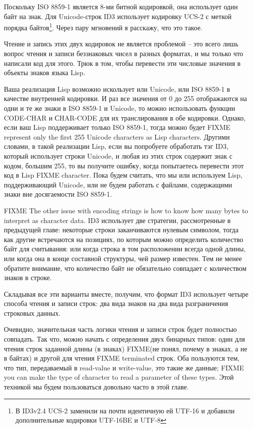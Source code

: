 Поскольку ISO 8859-1 является 8-ми битной кодировкой, она использует один байт на
знак. Для Unicode-строк ID3 использует кодировку UCS-2 с меткой порядка байтов\footnote{В
  ID3v2.4 UCS-2 заменили на почти идентичную ей UTF-16 и добавили дополнительные кодировки
  UTF-16BE и UTF-8}. Через пару мгновений я расскажу, что это такое.

Чтение и запись этих двух кодировок не является проблемой -- это всего лишь вопрос чтения
и записи беззнаковых чисел в разных форматах, и мы только что написали код для этого.
Трюк в том, чтобы перевести эти числовые значения в объекты знаков языка Lisp.

Ваша реализация Lisp возможно искользует или Unicode, или ISO 8859-1 в качестве внутренней
кодировки.  И раз все значения от 0 до 255 отображаются на одни и те же знаки в ISO 8859-1
и Unicode, то можно использовать функции CODE-CHAR и СHAR-CODE для их транслирования в обе
кодировки.  Однако, если ваш Lisp поддерживает только ISO 8859-1, тогда можно будет FIXME
represent only the first 255 Unicode characters as Lisp characters.  Другими словами, в
такой реализации Lisp, если вы попробуете обработать тэг ID3, который использует строки
Unicode, и любая из этих строк содержит знак с кодом, большим 255, то вы получите ошибку,
когда попытаетесь перевести этот код в Lisp FIXME character.  Пока будем считать, что мы
или используем Lisp, поддерживающий Unicode, или не будем работать с файлами, содержащими
знаки вне досягаемости ISO 8859-1.

FIXME The other issue with encoding strings is how to know how many bytes to interpret as
character data.  ID3 использует две стратегии, рассмотренные в предыдущей главе: некоторые
строки заканчиваются нулевым символом, тогда как другие встречаются на позициях, по
которым можно определить количество байт для считывания: или когда строка в том
расположении всегда одной длины, или когда она в конце составной структуры, чей размер
известен.  Тем не менее обратите внимание, что количество байт не обязательно совпадает с
количеством знаков в строке.

Складывая все эти варианты вместе, получим, что формат ID3 использует четыре способа
чтения и записи строк: два вида знаков на два вида разграничения строковых данных.

Очевидно, значительная часть логики чтения и записи строк будет полностью совпадать.  Так
что, можно начать с определения двух бинарных типов: один для чтения строк заданной длины
(в знаках) FIXME(не понял, почему в знаках, а не в байтах) и другой для чтения FIXME
terminated строк.  Оба пользуются тем, что тип, передаваемый в read-value и write-value,
это такие же данные; FIXME you can make the type of character to read a parameter of these
types.  Этой техникой мы будем пользоваться довольно часто в этой главе.

